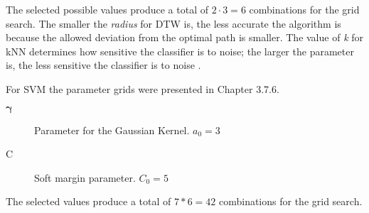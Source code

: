 The selected possible values produce a total of $2 \cdot 3 = 6$ combinations for the grid search. The smaller the \emph{radius} for DTW is, the less accurate the algorithm is because the allowed deviation from the optimal path is smaller. The value of \emph{k} for kNN determines how sensitive the classifier is to noise; the larger the parameter is, the less sensitive the classifier is to noise \cite{everitt11}.

For SVM the parameter grids were presented in Chapter 3.7.6.
\begin{description}
\item[$\mathbf{\gamma}$]{Parameter for the Gaussian Kernel. $a_0 = 3$}
\item[C]{Soft margin parameter. $C_0 = 5$}
\end{description}

The selected values produce a total of $7 * 6 = 42$ combinations for the grid search.




